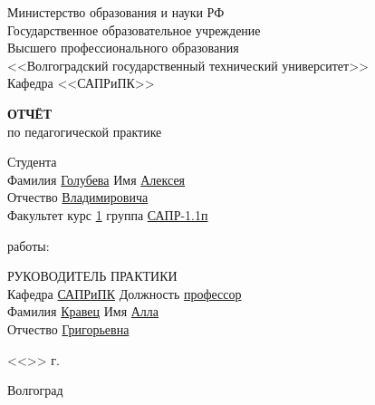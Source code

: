\documentclass[a4paper, 14pt]{extreport}
\begin{document}
    \begin{titlepage}
        \begin{center}
            Министерство образования и науки РФ \\
            Государственное образовательное учреждение\\
            Высшего профессионального образования\\
            <<Волгоградский государственный технический университет>>\\
            Кафедра <<САПРиПК>>
        \end{center}
        \vspace{2.0cm}
        \begin{center}
            \large \textbf{ОТЧЁТ} \\
            по педагогической практике
        \end{center}
        \begin{flushleft}
            Студента\\
            Фамилия \underline{Голубева\hspace{3.1cm}} 
            Имя \underline{Алексея\hspace{2.1cm}}\\
            Отчество \underline{Владимировича\hspace{1.6cm}}\\
            Факультет \underline{\hspace{4.8cm}} курс \underline{1\hspace{1.5cm}} 
            группа \underline{САПР-1.1п\hspace{1.9cm}}\\
        \end{flushleft}
        \vspace{1.0cm}
         работы: \underline{\hspace{10cm}}
        \vspace{2.0cm}
        \begin{flushleft}
            РУКОВОДИТЕЛЬ ПРАКТИКИ\\
            Кафедра \underline{САПРиПК\hspace{2.7cm}} Должность \underline{профессор\hspace{2.8cm}} \\
            Фамилия \underline{Кравец\hspace{3.3cm}} Имя \underline{Алла\hspace{5.5cm}}\\
            Отчество \underline{Григорьевна\hspace{2.2cm}}
        \end{flushleft}
        \vspace{1.5cm}
        \begin{flushright}
            <<\underline{\hspace{1.0cm}}>>\underline{\hspace{4.0cm}} \the\year г.
        \end{flushright}
        \vspace{\fill}
        \begin{center}
            Волгоград \the\year
        \end{center}
    \end{titlepage}
\end{document}

